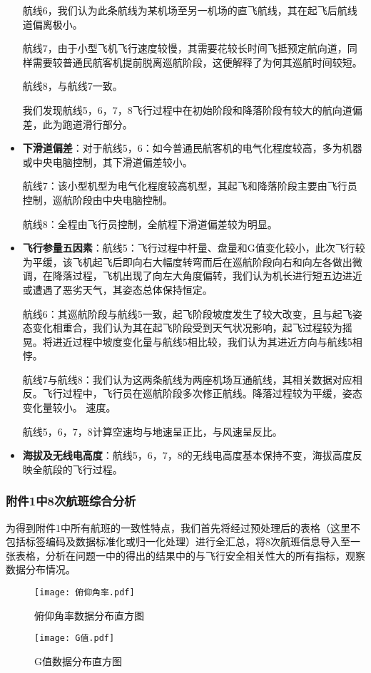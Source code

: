 \documentclass{MathorCupModeling}
\begin{document}
\begin{itemize}
		航线6，我们认为此条航线为某机场至另一机场的直飞航线，其在起飞后航线道偏离极小。
		
		航线7，由于小型飞机飞行速度较慢，其需要花较长时间飞抵预定航向道，同样需要较普通民航客机提前脱离巡航阶段，这便解释了为何其巡航时间较短。
		
		航线8，与航线7一致。
		
		我们发现航线5，6，7，8飞行过程中在初始阶段和降落阶段有较大的航向道偏差，此为跑道滑行部分。
		\item \textbf{下滑道偏差}：对于航线5，6：如今普通民航客机的电气化程度较高，多为机器或中央电脑控制，其下滑道偏差较小。
		
		航线7：该小型机型为电气化程度较高机型，其起飞和降落阶段主要由飞行员控制，巡航阶段由中央电脑控制。
		
		航线8：全程由飞行员控制，全航程下滑道偏差较为明显。
		\item \textbf{飞行参量五因素}：航线5：飞行过程中杆量、盘量和G值变化较小，此次飞行较为平缓，该飞机起飞后即向右大幅度转弯而后在巡航阶段向右和向左各做出微调，在降落过程，飞机出现了向左大角度偏转，我们认为机长进行短五边进近或遭遇了恶劣天气，其姿态总体保持恒定。
		
		航线6：其巡航阶段与航线5一致，起飞阶段坡度发生了较大改变，且与起飞姿态变化相重合，我们认为其在起飞阶段受到天气状况影响，起飞过程较为摇晃。将进近过程中坡度变化量与航线5相比较，我们认为其进近方向与航线5相悖。
		
		航线7与航线8：我们认为这两条航线为两座机场互通航线，其相关数据对应相反。飞行过程中，飞行员在巡航阶段多次修正航线。降落过程较为平缓，姿态变化量较小。
		速度。
		
		航线5，6，7，8计算空速均与地速呈正比，与风速呈反比。
		\item \textbf{海拔及无线电高度}：航线5，6，7，8的无线电高度基本保持不变，海拔高度反映全航段的飞行过程。
	\end{itemize}
	
	\subsubsection{附件1中8次航班综合分析}
	为得到附件1中所有航班的一致性特点，我们首先将经过预处理后的表格（这里不包括标签编码及数据标准化或归一化处理）进行全汇总，将8次航班信息导入至一张表格，分析在问题一中的得出的结果中的与飞行安全相关性大的所有指标，观察数据分布情况。
	\begin{figure}[H]
		\centering
		\begin{minipage}{0.48\linewidth}
			\centering
			\texttt{[image: 俯仰角率.pdf]}
			\caption{俯仰角率数据分布直方图}
			\label{fig:俯仰角率直方图}
		\end{minipage}
		\begin{minipage}{0.48\linewidth}
			\centering
			\texttt{[image: G值.pdf]}
			\caption{G值数据分布直方图}
			\label{fig:G值直方图}
		\end{minipage}
	\end{figure}
	
\end{document}
